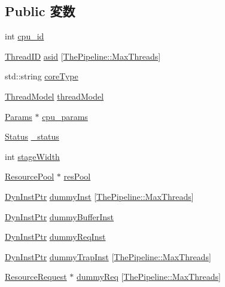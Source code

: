 \subsection*{Public 変数}
\begin{DoxyCompactItemize}
\item 
int \hyperlink{classInOrderCPU_af34f33b8a6a96ac6ee8b68b7ecd34ba9}{cpu\_\-id}
\item 
\hyperlink{base_2types_8hh_ab39b1a4f9dad884694c7a74ed69e6a6b}{ThreadID} \hyperlink{classInOrderCPU_a74d3a6e6aba6f28d4cb2e95b45b75f67}{asid} \mbox{[}\hyperlink{namespaceThePipeline_ac9c0bbe9cf27d93e08ea8ccc4096e633}{ThePipeline::MaxThreads}\mbox{]}
\item 
std::string \hyperlink{classInOrderCPU_a558887e3416d99727765dad3be5354d7}{coreType}
\item 
\hyperlink{classInOrderCPU_1_1ThreadModel}{ThreadModel} \hyperlink{classInOrderCPU_af190f1a05b1875acfda59f02e59e2fe0}{threadModel}
\item 
\hyperlink{classInOrderCPU_aa14874985381292db0aea05d1c8a122c}{Params} $\ast$ \hyperlink{classInOrderCPU_abd8a4a05c67ac6b36a477d4243ce9681}{cpu\_\-params}
\item 
\hyperlink{classInOrderCPU_a67a0db04d321a74b7e7fcfd3f1a3f70b}{Status} \hyperlink{classInOrderCPU_a6cdf6e6db875a442f3ab6db542bd2bb5}{\_\-status}
\item 
int \hyperlink{classInOrderCPU_a60be67c646e9cf5778b1eb73436194dc}{stageWidth}
\item 
\hyperlink{classResourcePool}{ResourcePool} $\ast$ \hyperlink{classInOrderCPU_a2979f0f9689d1d8615cacdc85c65e11f}{resPool}
\item 
\hyperlink{classRefCountingPtr}{DynInstPtr} \hyperlink{classInOrderCPU_a8f57f75c5150b34b12a0d461a8941704}{dummyInst} \mbox{[}\hyperlink{namespaceThePipeline_ac9c0bbe9cf27d93e08ea8ccc4096e633}{ThePipeline::MaxThreads}\mbox{]}
\item 
\hyperlink{classRefCountingPtr}{DynInstPtr} \hyperlink{classInOrderCPU_a09dc4a08ace7d6e74531ffff1ba5d905}{dummyBufferInst}
\item 
\hyperlink{classRefCountingPtr}{DynInstPtr} \hyperlink{classInOrderCPU_aee70a76b5dfeedede656757791734420}{dummyReqInst}
\item 
\hyperlink{classRefCountingPtr}{DynInstPtr} \hyperlink{classInOrderCPU_a102452fdf27d60fc9d2520e37b358be1}{dummyTrapInst} \mbox{[}\hyperlink{namespaceThePipeline_ac9c0bbe9cf27d93e08ea8ccc4096e633}{ThePipeline::MaxThreads}\mbox{]}
\item 
\hyperlink{classResourceRequest}{ResourceRequest} $\ast$ \hyperlink{classInOrderCPU_a5366ca890575a006d6c51690c157a959}{dummyReq} \mbox{[}\hyperlink{namespaceThePipeline_ac9c0bbe9cf27d93e08ea8ccc4096e633}{ThePipeline::MaxThreads}\mbox{]}

\end{DoxyCompactItemize}
